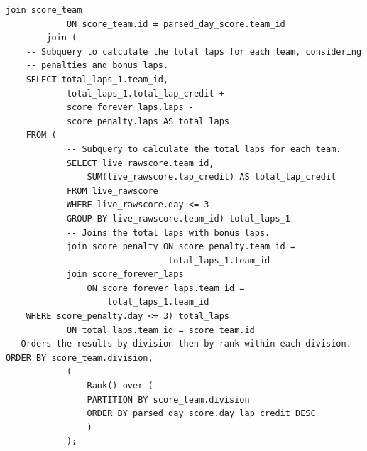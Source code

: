 \documentclass[11pt]{article}
\begin{document}
\begin{lstlisting}[style=sql, caption={Live Score Query for day 3}, label={lst:sql_live_scoring_query}]
        join score_team
            ON score_team.id = parsed_day_score.team_id
        join (
    -- Subquery to calculate the total laps for each team, considering
    -- penalties and bonus laps.
    SELECT total_laps_1.team_id,
            total_laps_1.total_lap_credit +
            score_forever_laps.laps -
            score_penalty.laps AS total_laps
    FROM (
            -- Subquery to calculate the total laps for each team.
            SELECT live_rawscore.team_id,
                SUM(live_rawscore.lap_credit) AS total_lap_credit
            FROM live_rawscore
            WHERE live_rawscore.day <= 3
            GROUP BY live_rawscore.team_id) total_laps_1
            -- Joins the total laps with bonus laps.
            join score_penalty ON score_penalty.team_id =
                                total_laps_1.team_id
            join score_forever_laps
                ON score_forever_laps.team_id =
                    total_laps_1.team_id
    WHERE score_penalty.day <= 3) total_laps
            ON total_laps.team_id = score_team.id
-- Orders the results by division then by rank within each division.
ORDER BY score_team.division,
            (
                Rank() over (
                PARTITION BY score_team.division
                ORDER BY parsed_day_score.day_lap_credit DESC
                )
            );
\end{lstlisting}
\end{document}
